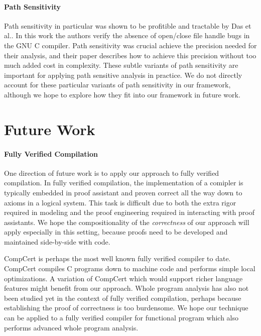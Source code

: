 \documentclass{article}
\begin{document}
\paragraph{Path Sensitivity}
Path sensitivity in particular was shown to be profitible and tractable by Das et al.\cite{das:2002:esp}.
In this work the authors verify the absence of open/close file handle bugs in the GNU C compiler.
Path sensitivity was crucial achieve the precision needed for their analysis, and their paper describes how to achieve this precision without too much added cost in complexity.
These subtle variants of path sensitivity are important for applying path sensitive analysis in practice.
We do not directly account for these particular variants of path sensitivity in our framework, 
  although we hope to explore how they fit into our framework in future work.

\section{Future Work}
\label{FutureWork}

\paragraph{Fully Verified Compilation}
One direction of future work is to apply our approach to fully verified compilation.
In fully verified compilation, the implementation of a comipler is typically embedded in proof assistant and proven correct all the way down to axioms in a logical system.
This task is difficult due to both the extra rigor required in modeling and the proof engineering required in interacting with proof assistants.
We hope the compositionality of the \emph{correctness} of our approach will apply especially in this setting, because proofs need to be developed and maintained side-by-side with code.

CompCert\cite{leroy:2009:compcert} is perhaps the most well known fully verified compiler to date.
CompCert compiles C programs down to machine code and performs simple local optimizations.
A variation of CompCert which would support richer language features might benefit from our approach.
Whole program analysis has also not been studied yet in the context of fully verified compilation, 
  perhaps because establishing the proof of correctness is too burdensome.
We hope our technique can be applied to a fully verified compiler for functional program which also performs advanced whole program analysis.
\end{document}
